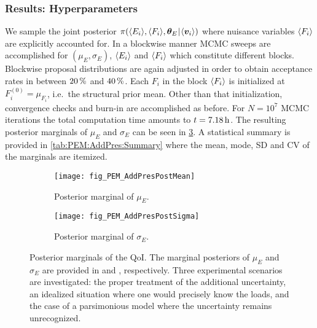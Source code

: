 \subsubsection{Results: Hyperparameters}
We sample the joint posterior \(\pi(\langle{E_i}\rangle,\langle{F_i}\rangle,\bm{\theta}_E {\:\!}|{\:\!} \langle{\bm{v}_i}\rangle)\) where nuisance variables \(\langle{F_i}\rangle\) are explicitly accounted for.
In a blockwise manner MCMC sweeps are accomplished for \((\mu_E,\sigma_E)\), \(\langle{E_i}\rangle\) and \(\langle{F_i}\rangle\) which constitute different blocks.
Blockwise proposal distributions are again adjusted in order to obtain acceptance rates in between \(\unit[20]{\%}\) and \(\unit[40]{\%}\).
Each \(F_i\) in the block \(\langle{F_i}\rangle\) is initialized at \(F_i^{(0)} = \mu_{F_i}\), i.e.\ the structural prior mean.
Other than that initialization, convergence checks and burn-in are accomplished as before.
For \(N=10^7\) MCMC iterations the total computation time amounts to \(t=\unit[7.18]{h}\).
The resulting posterior marginals of \(\mu_E\) and \(\sigma_E\) can be seen in \cref{fig:PEM:AddPres:Marginals}.
A statistical summary is provided in \cref{tab:PEM:AddPres:Summary} where the mean, mode, SD and CV of the marginals are itemized.
\begin{figure}[ht]
  \centering
  \begin{subfigure}[b]{0.5\textwidth}
    \centering
    \texttt{[image: fig\_PEM\_AddPresPostMean]}
    \caption{Posterior marginal of \(\mu_E\).}
    \label{fig:PEM:AddPres:Post:Mean}
  \end{subfigure}%
  \begin{subfigure}[b]{0.5\textwidth}
    \centering
    \texttt{[image: fig\_PEM\_AddPresPostSigma]}
    \caption{Posterior marginal of \(\sigma_E\).}
    \label{fig:PEM:AddPres:Post:Sigma}
  \end{subfigure}%
  \caption[Posterior marginals of the QoI]{Posterior marginals of the QoI.
           The marginal posteriors of \(\mu_E\) and \(\sigma_E\) are provided in  and , respectively.
           Three experimental scenarios are investigated: the proper treatment of the additional uncertainty, 
           an idealized situation where one would precisely know the loads, and the case of a parsimonious model where the uncertainty remains unrecognized.
          }
  \label{fig:PEM:AddPres:Marginals}
\end{figure}
